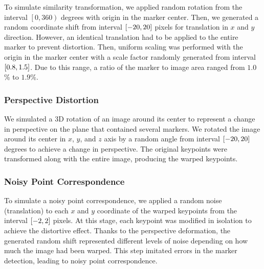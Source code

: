 To simulate similarity transformation, we applied random rotation from the interval $\left[0, 360\right)$ degrees with origin in the marker center. Then, we generated a random coordinate shift from interval $\left[ {-20, 20} \right]$ pixels for translation in $x$ and $y$ direction. However, an identical translation had to be applied to the entire marker to prevent distortion. Then, uniform scaling was performed with the origin in the marker center with a scale factor randomly generated from interval $\left[ {0.8, 1.5} \right]$. Due to this range, a ratio of the marker to image area ranged from $1.0$\% to $1.9$\%.

\subsubsection{Perspective Distortion}
We simulated a $3$D rotation of an image around its center to represent a change in perspective on the plane that contained several markers. We rotated the image around its center in $x$, $y$, and $z$ axis by a random angle from interval $\left[ {-20, 20} \right]$ degrees to achieve a change in perspective. The original keypoints were transformed along with the entire image, producing the warped keypoints.

\subsubsection{Noisy Point Correspondence}
To simulate a noisy point correspondence, we applied a random noise (translation) to each $x$ and $y$ coordinate of the warped keypoints from the interval $\left[ {-2, 2} \right]$ pixels. At this stage, each keypoint was modified in isolation to achieve the distortive effect. Thanks to the perspective deformation, the generated random shift represented different levels of noise depending on how much the image had been warped. This step imitated errors in the marker detection, leading to noisy point correspondence.

